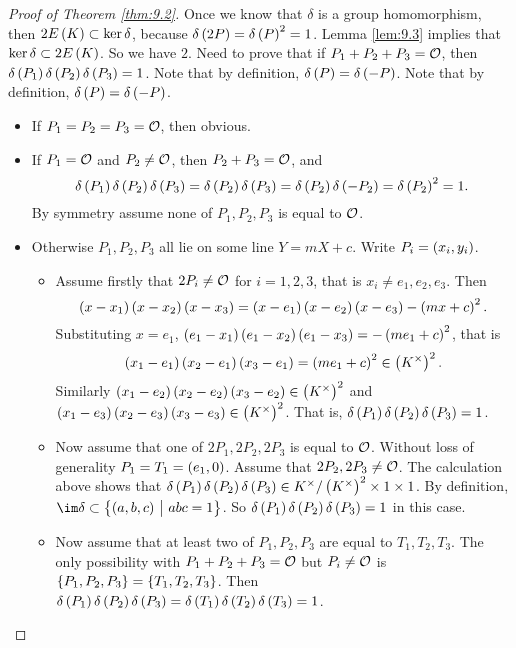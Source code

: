\begin{proof}[Proof of Theorem \ref{thm:9.2}]
Once we know that $ \delta $ is a group homomorphism, then $ 2E\br{K} \subset \ker \delta $, because $ \delta\br{2P} = \delta\br{P}^2 = 1 $. Lemma \ref{lem:9.3} implies that $ \ker \delta \subset 2E\br{K} $. So we have $ 2 $. Need to prove that if $ P_1 + P_2 + P_3 = \mathcal{O} $, then $ \delta\br{P_1}\delta\br{P_2}\delta\br{P_3} = 1 $. Note that by definition, $ \delta\br{P} = \delta\br{-P} $. Note that by definition, $ \delta\br{P} = \delta\br{-P} $.
\begin{itemize}
\item If $ P_1 = P_2 = P_3 = \mathcal{O} $, then obvious.
\item If $ P_1 = \mathcal{O} $ and $ P_2 \ne \mathcal{O} $, then $ P_2 + P_3 = \mathcal{O} $, and
$$ \delta\br{P_1}\delta\br{P_2}\delta\br{P_3} = \delta\br{P_2}\delta\br{P_3} = \delta\br{P_2}\delta\br{-P_2} = \delta\br{P_2}^2 = 1. $$
By symmetry assume none of $ P_1, P_2, P_3 $ is equal to $ \mathcal{O} $.

\pagebreak

\item Otherwise $ P_1, P_2, P_3 $ all lie on some line $ Y = mX + c $. Write $ P_i = \br{x_i, y_i} $.
\begin{itemize}
\item Assume firstly that $ 2P_i \ne \mathcal{O} $ for $ i = 1, 2, 3 $, that is $ x_i \ne e_1, e_2, e_3 $. Then
$$ \br{x - x_1}\br{x - x_2}\br{x - x_3} = \br{x - e_1}\br{x - e_2}\br{x - e_3} - \br{mx + c}^2. $$
Substituting $ x = e_1 $, $ \br{e_1 - x_1}\br{e_1 - x_2}\br{e_1 - x_3} = -\br{me_1 + c}^2 $, that is
$$ \br{x_1 - e_1}\br{x_2 - e_1}\br{x_3 - e_1} = \br{me_1 + c}^2 \in \br{K^\times}^2. $$
Similarly $ \br{x_1 - e_2}\br{x_2 - e_2}\br{x_3 - e_2} \in \br{K^\times}^2 $ and $ \br{x_1 - e_3}\br{x_2 - e_3}\br{x_3 - e_3} \in \br{K^\times}^2 $. That is, $ \delta\br{P_1}\delta\br{P_2}\delta\br{P_3} = 1 $.
\item Now assume that one of $ 2P_1, 2P_2, 2P_3 $ is equal to $ \mathcal{O} $. Without loss of generality $ P_1 = T_1 = \br{e_1, 0} $. Assume that $ 2P_2, 2P_3 \ne \mathcal{O} $. The calculation above shows that $ \delta\br{P_1}\delta\br{P_2}\delta\br{P_3} \in K^\times / \br{K^\times}^2 \times 1 \times 1 $. By definition, $ \im \delta \subset \cbr{\br{a, b, c} \st abc = 1} $. So $ \delta\br{P_1}\delta\br{P_2}\delta\br{P_3} = 1 $ in this case.
\item Now assume that at least two of $ P_1, P_2, P_3 $ are equal to $ T_1, T_2, T_3 $. The only possibility with $ P_1 + P_2 + P_3 = \mathcal{O} $ but $ P_i \ne \mathcal{O} $ is $ \cbr{P_1, P_2, P_3} = \cbr{T_1, T_2, T_3} $. Then $ \delta\br{P_1}\delta\br{P_2}\delta\br{P_3} = \delta\br{T_1}\delta\br{T_2}\delta\br{T_3} = 1 $.
\end{itemize}
\end{itemize}
\end{proof}

